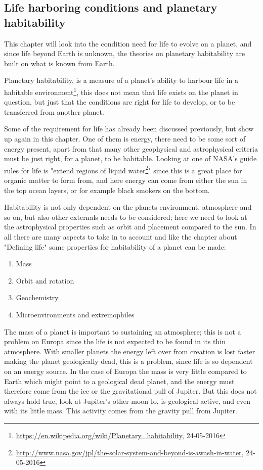 \subsection{Life harboring conditions and planetary habitability}

This chapter will look into the condition need for life to evolve on a planet, and since life beyond Earth is unknown, the theories on planetary habitability are built on what is known from Earth.

Planetary habitability, is a measure of a planet's ability to harbour life in a habitable environment\footnote{\url{https://en.wikipedia.org/wiki/Planetary_habitability}, 24-05-2016}, this does not mean that life exists on the planet in question, but just that the conditions are right for life to develop, or to be transferred from another planet.

Some of the requirement for life has already been discussed previously, but show up again in this chapter. One of them is energy, there need to be some sort of energy present, apart from that many other geophysical and astrophysical criteria must be just right, for a planet, to be habitable. Looking at one of NASA's guide rules for life is "extend regions of liquid water\footnote{\url{http://www.nasa.gov/jpl/the-solar-system-and-beyond-is-awash-in-water}, 24-05-2016}"  since this is a great place for organic matter to form from, and here energy can come from either the sun in the top ocean layers, or for example black smokers on the bottom.

Habitability is not only dependent on the planets environment, atmosphere and so on, but also other externals needs to be considered; here we need to look at the astrophysical properties such as orbit and placement compared to the sun. In all there are many aspects to take in to account and like the chapter about "Defining life" some properties for habitability of a planet can be made:

\begin{enumerate}
  \item Mass
  \item Orbit and rotation
  \item Geochemistry
  \item Microenvironments and extremophiles
\end{enumerate}

The mass of a planet is important to sustaining an atmosphere; this is not a problem on Europa since the life is not expected to be found in its thin atmosphere. With smaller planets the energy left over from creation is lost faster making the planet geologically dead, this is a problem, since life is so dependent on an energy source. In the case of Europa the mass is very little compared to Earth which might point to a geological dead planet, and the energy must therefore come from the ice or the gravitational pull of Jupiter. But this does not always hold true, look at Jupiter's other moon Io, is geological active, and even with its little mass. This activity comes from the gravity pull from Jupiter.

